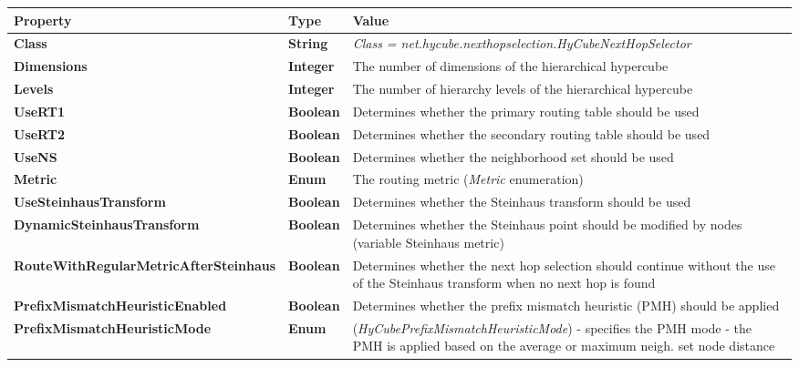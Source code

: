 \begin{center}
\scriptsize
\begin{longtable}{p{5.0cm} p{1.0cm} p{8.5cm}}
	\hline
	\textbf{Property}										& \textbf{Type}			& \textbf{Value}					\\[1mm]
    \hline
	\textbf{Class}											& \textbf{String}		& \textit{Class = net.hycube.nexthopselection.HyCubeNextHopSelector}			\\[1.5mm]
    \textbf{Dimensions}										& \textbf{Integer}		& The number of dimensions of the hierarchical hypercube					\\[1.5mm]
	\textbf{Levels}											& \textbf{Integer}		& The number of hierarchy levels of the hierarchical hypercube				\\[1.5mm]
	\textbf{UseRT1}											& \textbf{Boolean}		& Determines whether the primary routing table should be used						\\[1.5mm]
	\textbf{UseRT2}											& \textbf{Boolean}		& Determines whether the secondary routing table should be used						\\[1.5mm]
	\textbf{UseNS}											& \textbf{Boolean}		& Determines whether the neighborhood set should be used								\\[1.5mm]
	\textbf{Metric}											& \textbf{Enum}			& The routing metric (\emph{Metric} enumeration)								\\[1.5mm]
	\textbf{UseSteinhausTransform}							& \textbf{Boolean}		& Determines whether the Steinhaus transform should be used						\\[1.5mm]
	\textbf{DynamicSteinhausTransform}						& \textbf{Boolean}		& Determines whether the Steinhaus point should be modified by nodes (variable Steinhaus metric)			\\[1.5mm]
	\textbf{RouteWithRegularMetricAfterSteinhaus}			& \textbf{Boolean}		& Determines whether the next hop selection should continue without the use of the Steinhaus transform when no next hop is found		\\[1.5mm]
	\textbf{PrefixMismatchHeuristicEnabled}					& \textbf{Boolean}		& Determines whether the prefix mismatch heuristic (PMH) should be applied										\\[1.5mm]
	\textbf{PrefixMismatchHeuristicMode}					& \textbf{Enum}			& (\emph{HyCubePrefixMismatchHeuristicMode}) - specifies the PMH mode - the PMH is applied based on the average or maximum neigh. set node distance					\\[1.5mm]

\end{longtable}
\end{center}
